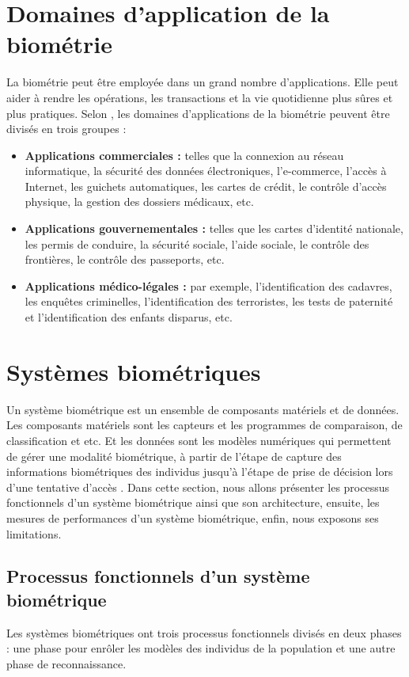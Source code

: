 \clearpage
\section{Domaines d’application de la biométrie}
La biométrie peut être employée dans un grand nombre d'applications. Elle peut aider à rendre les opérations, les transactions et la vie quotidienne plus sûres et plus pratiques. Selon \citep{Jain2004}, les domaines d’applications de la biométrie peuvent être divisés en trois groupes :
\begin{itemize}
	\item \textbf{Applications commerciales : }telles que la connexion au réseau informatique, la sécurité des données électroniques, l'e-commerce, l’accès à Internet, les guichets automatiques, les cartes de crédit, le contrôle d'accès physique, la gestion des dossiers médicaux, etc.
	\item \textbf{Applications gouvernementales : }telles que les cartes d'identité nationale, les permis de conduire, la sécurité sociale, l'aide sociale, le contrôle des frontières, le contrôle des passeports, etc.
	\item \textbf{Applications médico-légales : }par exemple, l’identification des cadavres, les enquêtes criminelles, l’identification des terroristes, les tests de paternité et l’identification des enfants disparus, etc.
\end{itemize}

\section{Systèmes biométriques}

Un système biométrique est un ensemble de composants matériels et de données. Les composants matériels sont les capteurs et les programmes de comparaison, de classification et etc. Et les données sont les modèles numériques qui permettent de gérer une modalité biométrique, à partir de l’étape de capture des informations biométriques des individus jusqu'à l’étape de prise de décision lors d’une tentative d’accès \citep{wayman2005introduction}. Dans cette section, nous allons présenter les processus fonctionnels d'un système biométrique ainsi que son architecture, ensuite, les mesures de performances d'un système biométrique, enfin, nous exposons ses limitations.
\subsection{Processus fonctionnels d’un système biométrique}
Les systèmes biométriques ont trois processus fonctionnels divisés en deux phases : une phase pour enrôler les modèles des individus de la population et une autre phase de reconnaissance\citep{Ross2004a}.

